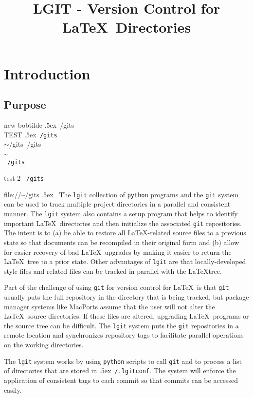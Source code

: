 \documentclass{ltxdoc}
\title{LGIT - Version Control for \LaTeX\ Directories}
\def\bobtilde{\lower.5ex\hbox{\tt \string~}}%
\def\ucmd#1{{\tt {#1}}}
\def\lgitconf{\bobtilde\ucmd{/.lgitconf}}
\def\mygits{\bobtilde\ucmd{/gits}}
\begin{document}
\maketitle
\tableofcontents
\newpage
\section{Introduction}
\subsection{Purpose}
new bobtilde \bobtilde/gits\\
TEST \mygits\\
$\sim$/gits
$~$/gits\\
\~{}\\

\edef\xtilde{\string~}
{\tt \xtilde/gits}

test 2 {\tt \string~/gits}

\url{file://~/gits} \bobtilde{}
The \ucmd{lgit} collection of \ucmd{python} programs and the \ucmd{git} system can be used to track multiple project directories in a parallel and consistent manner.  The \ucmd{lgit} system also contains a setup program that helps to identify important \LaTeX\ directories and then initialize the associated \ucmd{git} repositories.  The intent is to (a) be able to restore all \LaTeX-related source files to a previous state so that documents can be recompiled in their original form and (b) allow for easier recovery of bad \LaTeX\ upgrades by making it easier to return the \LaTeX\ tree to a prior state.  Other advantages of \ucmd{lgit} are that locally-developed style files and related files can be tracked in parallel with the \LaTeX tree.

Part of the challenge of using \ucmd{git} for version control for \LaTeX\ is that \ucmd{git} usually puts the full repository in the directory that is being tracked, but package manager systems like MacPorts assume that the user will not alter the \LaTeX\ source directories. If these files are altered, upgrading \LaTeX\ programs or the source tree can be difficult. The \ucmd{lgit} system puts the \ucmd{git} repositories in a remote location and synchronizes repository tags to facilitate parallel operations on the working directories.

The \ucmd{lgit} system works by using \ucmd{python} scripts to call \ucmd{git} and to process a list of directories that are stored in \lgitconf.  The system will enforce the application of consistent tags to each commit so that commits can be accessed easily.
\end{document}
